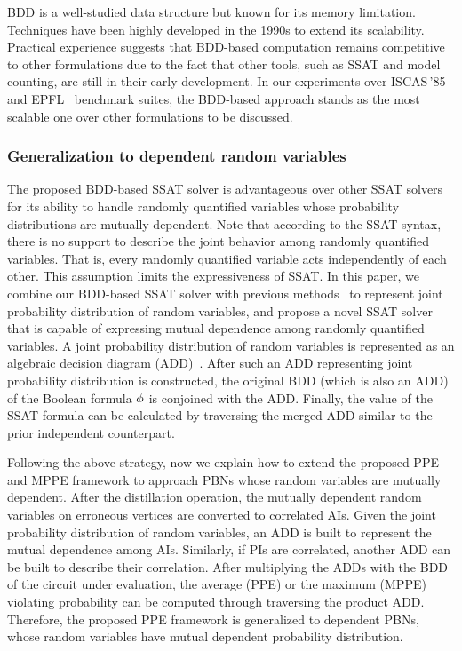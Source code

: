 BDD is a well-studied data structure but known for its memory limitation.
Techniques have been highly developed in the 1990s to extend its scalability.
Practical experience suggests that BDD-based computation remains competitive to other formulations
due to the fact that other tools,
such as SSAT and model counting,
are still in their early development.
In our experiments over ISCAS\,'85~\cite{ISCAS85-benchmark} and EPFL~\cite{EPFL-benchmark} benchmark suites,
the BDD-based approach stands as the most scalable one over other formulations to be discussed.

\subsubsection{Generalization to dependent random variables}
The proposed BDD-based SSAT solver is advantageous over other SSAT solvers for its ability to handle randomly quantified variables whose probability distributions are mutually dependent.
Note that according to the SSAT syntax,
there is no support to describe the joint behavior among randomly quantified variables.
That is, every randomly quantified variable acts independently of each other.
This assumption limits the expressiveness of SSAT.
In this paper, we combine our BDD-based SSAT solver with previous methods~\cite{Marculescu1998,Miskov-Zivanov2006}
to represent joint probability distribution of random variables,
and propose a novel SSAT solver that is capable of expressing mutual dependence among randomly quantified variables.
A joint probability distribution of random variables is represented as an algebraic decision diagram (ADD)~\cite{Marculescu1998,Miskov-Zivanov2006}.
After such an ADD representing joint probability distribution is constructed,
the original BDD (which is also an ADD) of the Boolean formula $\phi$ is conjoined with the ADD.
Finally, the value of the SSAT formula can be calculated by traversing the merged ADD similar to the prior independent counterpart.

Following the above strategy,
now we explain how to extend the proposed PPE and MPPE framework to approach PBNs whose random variables are mutually dependent.
After the distillation operation,
the mutually dependent random variables on erroneous vertices are converted to correlated AIs.
Given the joint probability distribution of random variables,
an ADD is built to represent the mutual dependence among AIs.
Similarly, if PIs are correlated,
another ADD can be built to describe their correlation.
After multiplying the ADDs with the BDD of the circuit under evaluation,
the average (PPE) or the maximum (MPPE) violating probability can be computed through traversing the product ADD.
Therefore, the proposed PPE framework is generalized to dependent PBNs,
whose random variables have mutual dependent probability distribution.

